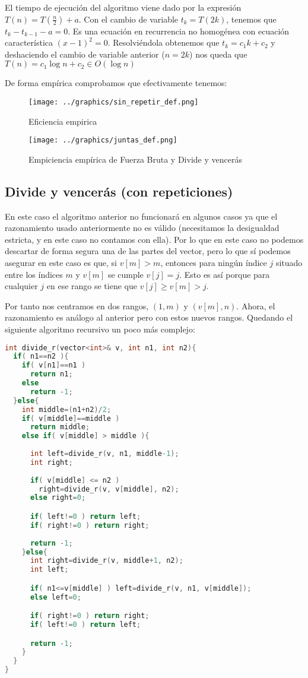 \documentclass[11pt]{article}
\begin{document}
El tiempo de ejecución del algoritmo viene dado por la expresión $T(n)=T(\frac{n}{2})+a$. Con el cambio de variable $t_k=T(2k)$, tenemos que $t_k-t_{k-1}-a=0$. Es una ecuación en recurrencia no homogénea con ecuación característica $(x-1)^2=0$. Resolviéndola obtenemos que $t_k=c_1k+c_2$ y deshaciendo el cambio de variable anterior ($n=2k$) nos queda que $T(n)=c_1\log n+c_2\in O(\log n)$ 

De forma empírica comprobamos que efectivamente tenemos:

\newpage

\begin{figure}[h]
\centering
\texttt{[image: ../graphics/sin\_repetir\_def.png]}
\caption{Eficiencia empirica}
\end{figure}


\begin{figure}[h]
\centering
\texttt{[image: ../graphics/juntas\_def.png]}
\caption{Empiciencia empírica de Fuerza Bruta y Divide y vencerás}
\end{figure}


\newpage

\subsection{Divide y vencerás (con repeticiones)}

En este caso el algoritmo anterior no funcionará en algunos casos ya que el razonamiento usado anteriormente no es válido (necesitamos la desigualdad estricta, y en este caso no contamos con ella).
Por lo que en este caso no podemos descartar de forma segura una de las partes del vector, pero lo que sí podemos asegurar en este caso es que, si $v[m]>m$, entonces para ningún índice $j$ situado entre los índices $m$ y $v[m]$ se cumple $v[j]=j$. Esto es así porque para cualquier $j$ en ese rango se tiene que $v[j]\geq v[m]>j$.

Por tanto nos centramos en dos rangos, $(1,m)$ y $(v[m], n)$. Ahora, el razonamiento es análogo al anterior pero con estos nuevos rangos. Quedando el siguiente algoritmo recursivo un poco más complejo:
\begin{lstlisting}[language=C]
int divide_r(vector<int>& v, int n1, int n2){
  if( n1==n2 ){
    if( v[n1]==n1 ) 
      return n1;
    else 
      return -1;
  }else{
    int middle=(n1+n2)/2;
    if( v[middle]==middle ) 
      return middle;
    else if( v[middle] > middle ){
      
      int left=divide_r(v, n1, middle-1);
      int right;
      
      if( v[middle] <= n2 ) 
        right=divide_r(v, v[middle], n2);
      else right=0;

      if( left!=0 ) return left;
      if( right!=0 ) return right;
      
      return -1;
    }else{
      int right=divide_r(v, middle+1, n2);
      int left;

      if( n1<=v[middle] ) left=divide_r(v, n1, v[middle]);
      else left=0;

      if( right!=0 ) return right;
      if( left!=0 ) return left;

      return -1;
    }
  }
}
\end{lstlisting}
\end{document}
